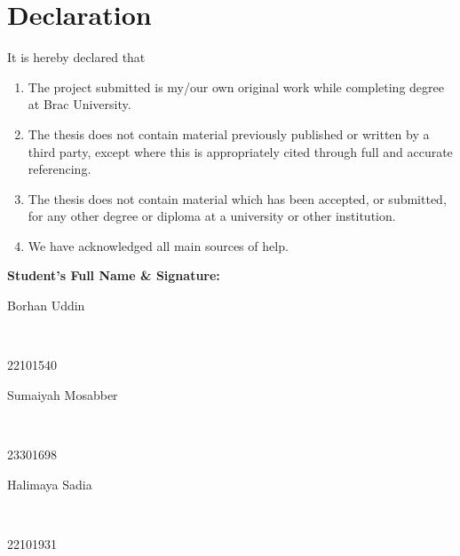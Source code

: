 \newcommand*\wildcard[2][6cm]{\vspace{2cm}\parbox{#1}{\hrulefill\par#2}} 


\section*{Declaration}

It is hereby declared that

\begin{enumerate} %
  \item The project submitted is my/our own original work while completing degree at Brac University.
  \item The thesis does not contain material previously published or written by a third party, except where this is appropriately cited through full and accurate referencing.
  \item The thesis does not contain material which has been accepted, or submitted, for any other degree or diploma at a university or other institution.
  \item We have acknowledged all main sources of help.
\end{enumerate}

\vspace{1cm}
\textbf{Student’s Full Name \& Signature:} %

\begingroup

    \begin{center}
        \wildcard{\centerline{Borhan Uddin} ~\\ \centerline{22101540}} %
        \hspace{2cm} %
        \wildcard{\centerline{Sumaiyah Mosabber} ~\\ \centerline{23301698} }
        \wildcard{\centerline{Halimaya Sadia} ~\\ \centerline{22101931} }
        \hspace{2cm}
    \end{center}

\endgroup


\pagebreak





